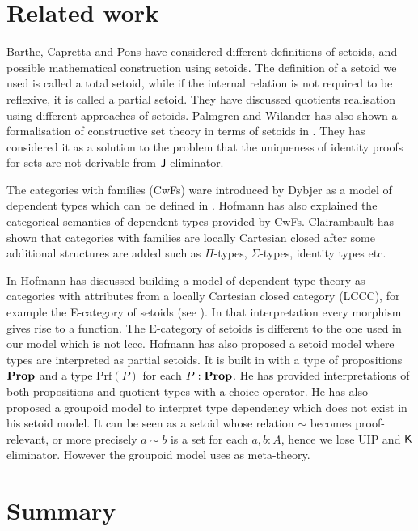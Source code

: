 \section{Related work}


Barthe, Capretta and Pons \cite{bar:03} have considered different definitions of setoids, and possible mathematical construction using setoids. The definition of a setoid we used is called a total setoid, while if the internal relation is not required to be reflexive, it is called a partial setoid.
They have discussed quotients realisation using different approaches of setoids.
Palmgren and Wilander \cite{Pal:14} has also shown a formalisation of constructive set theory in terms of setoids in \itt. They has considered it as a solution to the problem that the uniqueness of identity proofs for sets are not derivable from $\operatorname{\mathsf{J}}$ eliminator.

The categories with families (CwFs) ware introduced by Dybjer \cite{Dyb:96} as a model of dependent types which can be defined in \itt. Hofmann \cite{hof:97} has also explained the categorical semantics of dependent types provided by CwFs. Clairambault \cite{clairambault2005categories} has shown that categories with families are locally Cartesian closed after some additional structures are added such as $\Pi$-types, $\Sigma$-types, identity types etc.

In \cite{hofmann1994interpretation} Hofmann has discussed building a model of dependent type theory as categories with attributes from a locally Cartesian closed category (LCCC), for example the E-category of setoids (see ). In that interpretation every morphism gives rise to a function. The E-category of setoids is different to the one used in our model which is not lccc. 
Hofmann \cite{hof:phd,hof:95:sm} has also proposed a setoid model where types are interpreted as partial setoids. It is built in \itt with a type of propositions $\operatorname{\mathbf{Prop}}$ and a type $\text{Prf}(P)$ for each $P : \operatorname{\mathbf{Prop}}$. He has provided interpretations of both propositions and quotient types with a choice operator.
He has also proposed a groupoid model \cite{hof:phd,MR1686862} to interpret type dependency which does not exist in his setoid model. It can be seen as a setoid whose relation $\sim$ becomes proof-relevant, or more precisely $a \sim b$ is a set for each $a, b : A$, hence we lose UIP and $\operatorname{\mathsf{K}}$ eliminator. However the groupoid model uses \ett as meta-theory.

\section{Summary}


